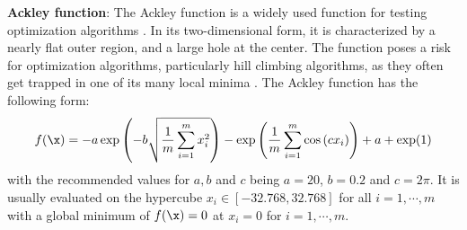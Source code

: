 \documentclass [PhD] {package/uclathes}
\begin{document}
\textbf{Ackley function}:
The Ackley function is a widely used function for testing optimization algorithms \parencite{adorio2005mvf, molga2005test}. In its two-dimensional form, it is characterized by a nearly flat outer region, and a large hole at the center. The function poses a risk for optimization algorithms, particularly hill climbing algorithms, as they often get trapped in one of its many local minima \parencite{simulationlib}. The Ackley function has the following form:
\begin{equation*}
f(\x)=-a \exp \left(-b \sqrt{\frac{1}{m} \sum_{i=1}^m x_i^2}\right)-\exp \left(\frac{1}{m} \sum_{i=1}^m \cos \left(c x_i\right)\right)+a+\exp (1)
\end{equation*}
with the recommended values for $a,b$ and $c$ being $a = 20$, $b=0.2$ and $c = 2\pi$. It is usually evaluated on the hypercube $x_i \in [-32.768, 32.768]$ for all $i=1,\cdots,m$ with a global minimum of $f(\x)=0$ at $x_i = 0$ for $i=1,\cdots,m$.
\end{document}
